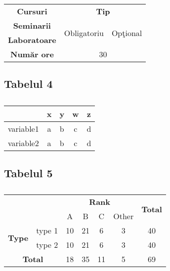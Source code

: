 \documentclass{article}
\begin{document}
\begin{table}[htbp]
	\centering
	\begin{tabular}{|c|c|c|}
		\hline
		\textbf{Cursuri} & \multicolumn{2}{c|}{\textbf{Tip}} \\
		\cline{2-3}
		\textbf{Seminarii} & \multirow{2}{*}{Obligatoriu} & \multirow{2}{*}{Opţional} \\
		\textbf{Laboratoare} &  &\\
		\hline
		\hline
		\textbf{Număr ore} & \multicolumn{2}{c|}{30} \\
		\hline
	\end{tabular}
	\caption{}
\end{table}

\subsection*{Tabelul 4}

\begin{table}[htbp]
	\centering
	\begin{tabular}{c c c c c}
		\hline
		& x & y & w & z\\
		\hline
		\multicolumn{1}{c|}{variable1} & \multicolumn{1}{c|}{a} & \multicolumn{1}{c|}{b} & \multicolumn{1}{c|}{c} & d \\
		\multicolumn{1}{c|}{variable2} & \multicolumn{1}{c|}{a} & \multicolumn{1}{c|}{b} & \multicolumn{1}{c|}{c} & d \\
		\hline
	\end{tabular}
	\caption{}
\end{table}

\subsection*{Tabelul 5}

\begin{table}[htbp]
	\centering
	\begin{tabular}{|c| c| c| c| c| c| c|}
		\hline
		\multicolumn{2}{|c|}{\multirow{2}{*}{}} & \multicolumn{4}{c|}{\textbf{Rank}} & \multirow{2}{*}{\textbf{Total}} \\
		\cline{3-6}
		\multicolumn{1}{|c}{}& & A & B & C& Other & \\
		\hline

		\multirow{2}{*}{\textbf{Type}} & type 1& 10 & 21 & 6 & 3& 40 \\
		\cline{2-7}
		& type 2 & 10 & 21 & 6 & 3 & 40 \\
		\hline
		\multicolumn{2}{|c|}{\textbf{Total}} & 18  & 35 & 11 & 5 & 69 \\
		\hline
	\end{tabular}
	\caption{}
\end{table}
\end{document}
